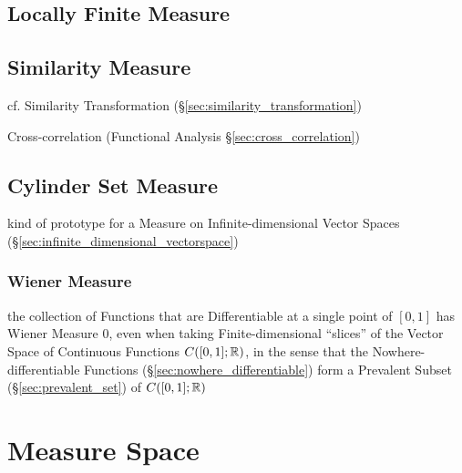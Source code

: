 \subsection{Locally Finite Measure}\label{sec:locally_finite_measure}

\subsection{Similarity Measure}\label{sec:similarity_measure}

\fist cf. Similarity Transformation (\S\ref{sec:similarity_transformation})

Cross-correlation (Functional Analysis \S\ref{sec:cross_correlation})



\subsection{Cylinder Set Measure}\label{sec:cylinder_set_measure}

kind of prototype for a Measure on Infinite-dimensional Vector Spaces
(\S\ref{sec:infinite_dimensional_vectorspace})



\subsubsection{Wiener Measure}\label{sec:wiener_measure}\hfill

the collection of Functions that are Differentiable at a single point of
$[0,1]$ has Wiener Measure $0$, even when taking Finite-dimensional ``slices''
of the Vector Space of Continuous Functions $C([0,1];\mathbb{R})$, in the sense
that the Nowhere-differentiable Functions (\S\ref{sec:nowhere_differentiable})
form a Prevalent Subset (\S\ref{sec:prevalent_set}) of $C([0,1]; \mathbb{R})$



\section{Measure Space}\label{sec:measure_space}

